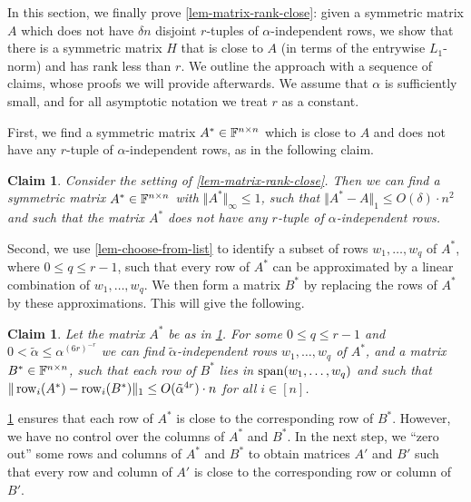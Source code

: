 \documentclass{daj}
\theoremstyle{plain}
\theoremstyle{plain}
\theoremstyle{plain}
\theoremstyle{plain}
\theoremstyle{definition}
\theoremstyle{plain}
\theoremstyle{plain}
\theoremstyle{definition}
\theoremstyle{definition}
\theoremstyle{plain}
\newtheorem{claim}[thm]{Claim}
\begin{document}
In this section, we finally prove \cref{lem-matrix-rank-close}: given a symmetric matrix $A$ which does not have $\delta n$ disjoint $r$-tuples of $\alpha$-independent rows, we show that there is a symmetric matrix $H$ that is close to $A$ (in terms of the entrywise $L_1$-norm) and has rank less than $r$. We outline the approach with a sequence of claims, whose proofs we will provide afterwards. We assume that $\alpha$ is sufficiently small, and for all asymptotic notation we treat $r$ as a constant.

First, we find a symmetric matrix $A^*\in \mathbb{F}^{n\times n}$ which is close to $A$ and does not have any $r$-tuple of $\alpha$-independent rows, as in the following claim.

\begin{claim}\label{claim-matrix-A-star}
Consider the setting of \cref{lem-matrix-rank-close}. Then we can find a symmetric matrix $A^*\in \mathbb{F}^{n\times n}$ with $\Vert A^*\Vert_\infty\le 1$, such that $\Vert A^*-A\Vert_1\leq O(\delta)\cdot n^2$ and such that the matrix $A^*$ does not have any $r$-tuple of $\alpha$-independent rows.
\end{claim}

Second, we use \cref{lem-choose-from-list} to identify a subset of rows $w_1,\dots,w_q$ of $A^*$, where $0\leq q\leq r-1$, such that every row of $A^*$ can be approximated by a linear combination of $w_1,\dots,w_q$. We then form a matrix $B^*$ by replacing the rows of $A^*$ by these approximations. This will give the following.

\begin{claim}\label{claim:close-to-special-low-rank}
Let the matrix $A^*$ be as in \cref{claim-matrix-A-star}. For some $0\leq q\leq r-1$ and $0<\tilde{\alpha}\le \alpha^{(6r)^{-r}}$ we can find $\tilde\alpha$-independent rows $w_1,\dots,w_q$ of $A^*$, and a matrix $B^*\in \mathbb{F}^{n\times n}$, such that each row of $B^*$ lies in $\operatorname{span}(w_1,\dots,w_q)$ and such that $\Vert \operatorname{row}_i(A^*)-\operatorname{row}_i(B^*)\Vert_1\le O(\tilde \alpha^{4r})\cdot n$ for all $i\in [n]$.
\end{claim}

\cref{claim:close-to-special-low-rank} ensures that each row of $A^*$ is close to the corresponding row of $B^*$. However, we have no control over the columns of $A^*$ and $B^*$. In the next step, we ``zero out'' some rows and columns of $A^*$ and $B^*$ to obtain matrices $A'$ and $B'$ such that every row and column of $A'$ is close to the corresponding row or column of $B'$.
\end{document}
